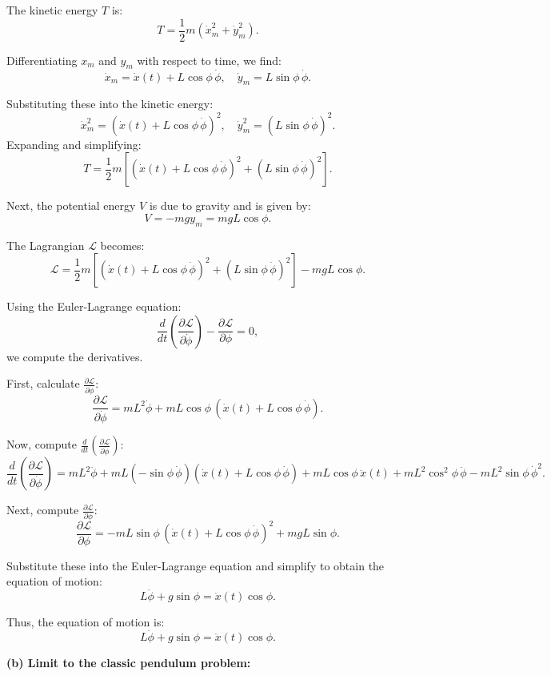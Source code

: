 \documentclass{article}
\begin{document}
The kinetic energy $T$ is:
\[
T = \frac{1}{2}m\left(\dot{x}_m^2 + \dot{y}_m^2\right).
\]

Differentiating $x_m$ and $y_m$ with respect to time, we find:
\[
\dot{x}_m = \dot{x}(t) + L\cos\phi \, \dot{\phi}, \quad \dot{y}_m = L\sin\phi \, \dot{\phi}.
\]

Substituting these into the kinetic energy:
\[
\dot{x}_m^2 = \left(\dot{x}(t) + L\cos\phi \, \dot{\phi}\right)^2, \quad
\dot{y}_m^2 = \left(L\sin\phi \, \dot{\phi}\right)^2.
\]
Expanding and simplifying:
\[
T = \frac{1}{2}m \left[\left(\dot{x}(t) + L\cos\phi \, \dot{\phi}\right)^2 + \left(L\sin\phi \, \dot{\phi}\right)^2 \right].
\]

Next, the potential energy $V$ is due to gravity and is given by:
\[
V = -mg y_m = mgL\cos\phi.
\]

The Lagrangian $\mathcal{L}$ becomes:
\[
\mathcal{L} = \frac{1}{2}m \left[\left(\dot{x}(t) + L\cos\phi \, \dot{\phi}\right)^2 + \left(L\sin\phi \, \dot{\phi}\right)^2 \right] - mgL\cos\phi.
\]

Using the Euler-Lagrange equation:
\[
\frac{d}{dt} \left(\frac{\partial \mathcal{L}}{\partial \dot{\phi}}\right) - \frac{\partial \mathcal{L}}{\partial \phi} = 0,
\]
we compute the derivatives.

First, calculate $\frac{\partial \mathcal{L}}{\partial \dot{\phi}}$:
\[
\frac{\partial \mathcal{L}}{\partial \dot{\phi}} = mL^2\dot{\phi} + mL\cos\phi \, \left(\dot{x}(t) + L\cos\phi \, \dot{\phi}\right).
\]

Now, compute $\frac{d}{dt}\left(\frac{\partial \mathcal{L}}{\partial \dot{\phi}}\right)$:
\[
\frac{d}{dt}\left(\frac{\partial \mathcal{L}}{\partial \dot{\phi}}\right) = mL^2\ddot{\phi} + mL(-\sin\phi \, \dot{\phi})\left(\dot{x}(t) + L\cos\phi \, \dot{\phi}\right) + mL\cos\phi \, \ddot{x}(t) + mL^2\cos^2\phi \, \ddot{\phi} - mL^2\sin\phi \, \dot{\phi}^2.
\]

Next, compute $\frac{\partial \mathcal{L}}{\partial \phi}$:
\[
\frac{\partial \mathcal{L}}{\partial \phi} = -mL\sin\phi \, \left(\dot{x}(t) + L\cos\phi \, \dot{\phi}\right)^2 + mgL\sin\phi.
\]

Substitute these into the Euler-Lagrange equation and simplify to obtain the equation of motion:
\[
L\ddot{\phi} + g\sin\phi = \ddot{x}(t)\cos\phi.
\]

Thus, the equation of motion is:
\[
\boxed{L\ddot{\phi} + g\sin\phi = \ddot{x}(t)\cos\phi.}
\]

\textbf{(b) Limit to the classic pendulum problem:}
\end{document}
